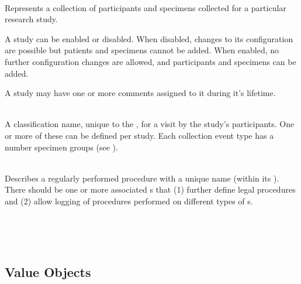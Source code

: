 \begin{description}[listparindent=\parindent]

  \item[\entitytarget{Study}] \hfill \\ Represents a collection of participants and
    specimens collected for a particular research study.

    A study can be enabled or disabled. When disabled, changes to its
    configuration are possible but patients and specimens cannot be added. When
    enabled, no further configuration changes are allowed, and participants and
    specimens can be added.

    A study may have one or more comments assigned to it during it's lifetime.

  \item[\entitytarget{CollectionEventType}] \hfill \\ A classification name,
    unique to the , for a visit by the study's
    participants. One or more of these can be defined per study. Each
    collection event type has a number specimen groups (see
    ).

  \item[\entitytarget{ProcessingType}] \hfill \\ Describes a regularly
    performed procedure with a unique name (within its
    ). There should be one or more associated
    s that (1) further define legal
    procedures and (2) allow logging of procedures performed on different types
    of s.

  \item[\entitytarget{}] \hfill \\

  \item[\entitytarget{}] \hfill \\


\end{description}

\subsection{Value Objects}

